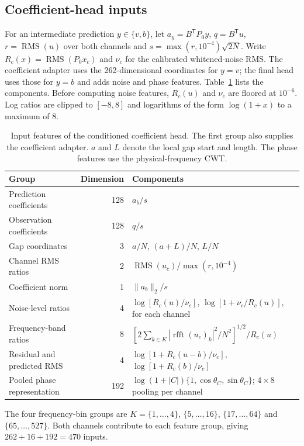 \documentclass[10pt,prd,aps,a4paper,twocolumn,superscriptaddress,nofootinbib,floatfix]{revtex4-2}
\begin{document}
\subsection{Coefficient-head inputs}
For an intermediate prediction $y\in\{v,b\}$, let $a_y=B^{\mathsf T}P_0y$, $q=B^{\mathsf T}u$, $r=\operatorname{RMS}(u)$ over both channels and $s=\max(r,10^{-4})\sqrt{2N}$. Write $R_c(x)=\operatorname{RMS}(P_0x_c)$ and $\nu_c$ for the calibrated whitened-noise RMS. The coefficient adapter uses the 262-dimensional coordinates for $y=v$; the final head uses those for $y=b$ and adds noise and phase features. Table~\ref{tab:head_features} lists the components. Before computing noise features, $R_c(u)$ and $\nu_c$ are floored at $10^{-6}$. Log ratios are clipped to $[-8,8]$ and logarithms of the form $\log(1+x)$ to a maximum of 8.

\begin{table}[t]\centering
\caption{Input features of the conditioned coefficient head. The first group also supplies the coefficient adapter. $a$ and $L$ denote the local gap start and length. The phase features use the physical-frequency CWT.}\label{tab:head_features}
\begin{tabular}{lrl}\hline\hline
Group & Dimension & Components\\\hline
Prediction coefficients & 128 & $a_b/s$\\
Observation coefficients & 128 & $q/s$\\
Gap coordinates & 3 & $a/N$, $(a+L)/N$, $L/N$\\
Channel RMS ratios & 2 & $\operatorname{RMS}(u_c)/\max(r,10^{-4})$\\
Coefficient norm & 1 & $\|a_b\|_2/s$\\\hline
Noise-level ratios & 4 & $\log[R_c(u)/\nu_c]$, $\log[1+\nu_c/R_c(u)]$, for each channel\\
Frequency-band ratios & 8 & $[2\sum_{k\in K}|\operatorname{rfft}(u_c)_k|^2/N^2]^{1/2}/R_c(u)$\\
Residual and predicted RMS & 4 & $\log[1+R_c(u-b)/\nu_c]$, $\log[1+R_c(b)/\nu_c]$\\\hline
Pooled phase representation & 192 & $\log(1+|C|)\{1,\cos\theta_C,\sin\theta_C\}$; $4\times8$ pooling per channel\\
\hline\hline\end{tabular}

\smallskip\parbox{0.96\textwidth}{The four frequency-bin groups are $K=\{1,\ldots,4\}$, $\{5,\ldots,16\}$, $\{17,\ldots,64\}$ and $\{65,\ldots,527\}$. Both channels contribute to each feature group, giving $262+16+192=470$ inputs.}
\end{table}
\end{document}
